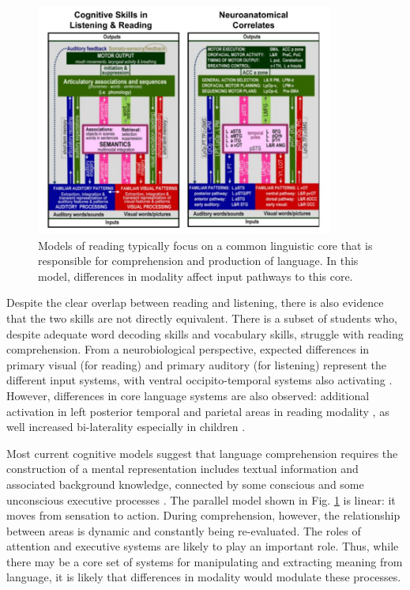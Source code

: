\begin{figure}[t]
	\centering
	\includegraphics[height=3in]{images/ch2-price-language-models.jpg}
	\caption[Schematics of skills and brain areas used in reading.]{Models of reading typically focus on a common linguistic core that is responsible for comprehension and production of language. In this model, differences in modality affect input pathways to this core.}
	\label{fig:ch2-price-language-models}
\end{figure}

Despite the clear overlap between reading and listening, there is also evidence that the two skills are not directly equivalent. There is a subset of students who, despite adequate word decoding skills and vocabulary skills, struggle with reading comprehension\citep{Nation2010, Spencer2011}. From a neurobiological perspective, expected differences in primary visual (for reading) and primary auditory (for listening) represent the different input systems, with ventral occipito-temporal systems also activating \citep{Jobard2007}. However, differences in core language systems are also observed: additional activation in left posterior temporal and parietal areas in reading modality \citep{Constable2015}, as well increased bi-laterality especially in children \citep{Berl2010}. 

Most current cognitive models suggest that language comprehension requires the construction of a mental representation includes textual information and associated background knowledge, connected by some conscious and some unconscious executive processes \citep{Kendou2014}. The parallel model shown in Fig. \ref{fig:ch2-price-language-models} is linear: it moves from sensation to action. During comprehension, however, the relationship between areas is dynamic and constantly being re-evaluated. The roles of attention and executive systems are likely to play an important role. Thus, while there may be a core set of systems for manipulating and extracting meaning from language, it is likely that differences in modality would modulate these processes. 

